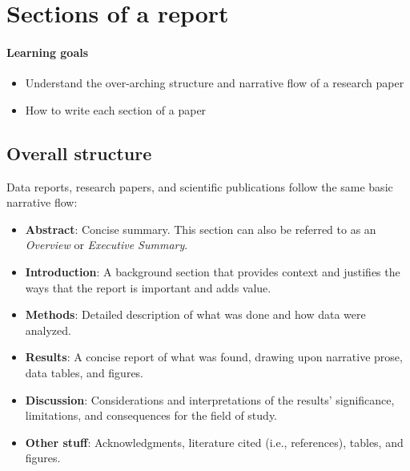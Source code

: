 \documentclass[
]{book}
\providecommand{\tightlist}{%
  \setlength{\itemsep}{0pt}\setlength{\parskip}{0pt}}
\begin{document}
\hypertarget{sections-of-a-report}{%
\chapter{Sections of a report}\label{sections-of-a-report}}

\hypertarget{learning-goals-18}{%
\subsubsection*{Learning goals}\label{learning-goals-18}}

\begin{itemize}
\tightlist
\item
  Understand the over-arching structure and narrative flow of a research paper\\
\item
  How to write each section of a paper
\end{itemize}

\hypertarget{overall-structure}{%
\section*{Overall structure}\label{overall-structure}}

Data reports, research papers, and scientific publications follow the same basic narrative flow:

\begin{itemize}
\tightlist
\item
  \textbf{Abstract}: Concise summary. This section can also be referred to as an \emph{Overview} or \emph{Executive Summary}.
\item
  \textbf{Introduction}: A background section that provides context and justifies the ways that the report is important and adds value.\\
\item
  \textbf{Methods}: Detailed description of what was done and how data were analyzed.\\
\item
  \textbf{Results}: A concise report of what was found, drawing upon narrative prose, data tables, and figures.
\item
  \textbf{Discussion}: Considerations and interpretations of the results' significance, limitations, and consequences for the field of study.
\item
  \textbf{Other stuff}: Acknowledgments, literature cited (i.e., references), tables, and figures.
\end{itemize}
\end{document}
